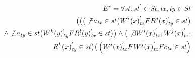 \documentclass{sig-alternate-05-2015}
\begin{document}
  \begin{align}\label{eqn:PL2}
\begin{split}
E^{r} = \forall  \mathit{st}, \mathit{st}^{'} \in  \mathit{St}, \mathit{tx}, \mathit{ty} \in  \mathit{St} \\ \big(
 \big( \big( \not\exists a_\mathit{tx} \in \mathit{st}
 \big(  {W^i}(x)^{'}_\mathit{tx} F {R^j}(x)^{'}_\mathit{ty} \in \mathit{st} \big) \\
  \wedge  \not\exists a_\mathit{ty} \in \mathit{st}
 \big( {W^k}(y)^{'}_\mathit{ty} F {R^l}(y)^{'}_\mathit{tx} \in \mathit{st}  \big) \big) \wedge
 \big( \not\exists  {W^i}(x)^{'}_\mathit{tx}, {W^j}(x)^{'}_\mathit{tx}, \\ {R^k}(x)^{'}_\mathit{ty} \in  \mathit{st}  \big)
 \big( \left( {W^i}(x)^{'}_\mathit{tx}  F {W^j}(x)^{'}_\mathit{tx} F  c_\mathit{tx} \in  \mathit{st} \right) \\

\end{split}
\end{align}
\end{document}

